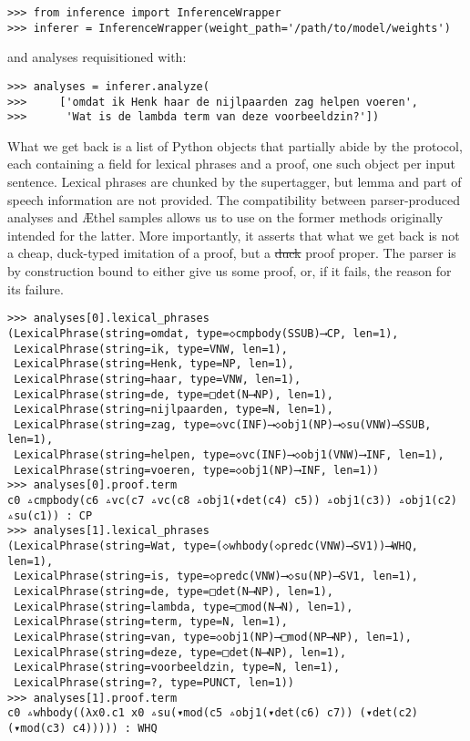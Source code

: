 \begin{verbatim}
>>> from inference import InferenceWrapper
>>> inferer = InferenceWrapper(weight_path='/path/to/model/weights')
\end{verbatim}

\noindent and analyses requisitioned with:
\begin{verbatim}
>>> analyses = inferer.analyze(
>>>     ['omdat ik Henk haar de nijlpaarden zag helpen voeren',
>>>      'Wat is de lambda term van deze voorbeeldzin?'])
\end{verbatim}

\noindent What we get back is a list of Python objects that partially abide by the  protocol, each containing a field for lexical phrases and a proof, one such object per input sentence.
Lexical phrases are chunked by the supertagger, but lemma and part of speech information are not provided.
The compatibility between parser-produced analyses and \AE thel samples allows us to use on the former methods originally intended for the latter.
More importantly, it asserts that what we get back is not a cheap, duck-typed imitation of a proof, but a \sout{duck} proof proper. 
The parser is by construction bound to either give us some proof, or, if it fails, the reason for its failure. 

\begin{verbatim}
>>> analyses[0].lexical_phrases
(LexicalPhrase(string=omdat, type=◇cmpbody(SSUB)⟶CP, len=1),
 LexicalPhrase(string=ik, type=VNW, len=1),
 LexicalPhrase(string=Henk, type=NP, len=1),
 LexicalPhrase(string=haar, type=VNW, len=1),
 LexicalPhrase(string=de, type=□det(N⟶NP), len=1),
 LexicalPhrase(string=nijlpaarden, type=N, len=1),
 LexicalPhrase(string=zag, type=◇vc(INF)⟶◇obj1(NP)⟶◇su(VNW)⟶SSUB, len=1),
 LexicalPhrase(string=helpen, type=◇vc(INF)⟶◇obj1(VNW)⟶INF, len=1),
 LexicalPhrase(string=voeren, type=◇obj1(NP)⟶INF, len=1))
>>> analyses[0].proof.term
c0 ▵cmpbody(c6 ▵vc(c7 ▵vc(c8 ▵obj1(▾det(c4) c5)) ▵obj1(c3)) ▵obj1(c2) ▵su(c1)) : CP
>>> analyses[1].lexical_phrases
(LexicalPhrase(string=Wat, type=(◇whbody(◇predc(VNW)⟶SV1))⟶WHQ, len=1),
 LexicalPhrase(string=is, type=◇predc(VNW)⟶◇su(NP)⟶SV1, len=1),
 LexicalPhrase(string=de, type=□det(N⟶NP), len=1),
 LexicalPhrase(string=lambda, type=□mod(N⟶N), len=1),
 LexicalPhrase(string=term, type=N, len=1),
 LexicalPhrase(string=van, type=◇obj1(NP)⟶□mod(NP⟶NP), len=1),
 LexicalPhrase(string=deze, type=□det(N⟶NP), len=1),
 LexicalPhrase(string=voorbeeldzin, type=N, len=1),
 LexicalPhrase(string=?, type=PUNCT, len=1))
>>> analyses[1].proof.term
c0 ▵whbody((λx0.c1 x0 ▵su(▾mod(c5 ▵obj1(▾det(c6) c7)) (▾det(c2) (▾mod(c3) c4))))) : WHQ
\end{verbatim}

